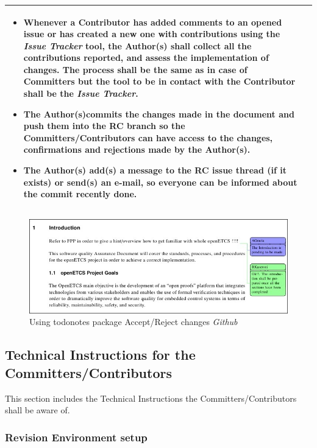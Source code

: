 \documentclass{template/openetcs_article}
\begin{document}
\begin{flushleft}
\begin{supertabular}{|m{2cm}|m{13cm}|}
\begin{itemize}
\begin{enumerate}
\end{enumerate}
\item Whenever a Contributor has added comments to an opened issue or has created a new one with contributions using the {\it Issue Tracker} tool, the Author(s) shall collect all the contributions reported, and assess the implementation of changes. The process shall be the same as in case of Committers but the tool to be in contact with the Contributor shall be the {\it Issue Tracker}.
\item The Author(s)commits the changes made in the document and push them into the RC branch so the Committers/Contributors can have access to the changes, confirmations and rejections made by the Author(s).
\item The Author(s) add(s) a message to the RC issue thread (if it exists) or send(s) an e-mail, so everyone can be informed about the commit recently done. 
\end{itemize}
\\\hline
\end{supertabular}
\end{flushleft}

\begin{figure}[H]
\centering
\includegraphics [width=\textwidth]{./figures/CommentConfirmation.JPG}
\caption{Using todonotes package Accept/Reject changes {\it Github}}
\end{figure}

\subsection{Technical Instructions for the Committers/Contributors}

This section includes the Technical Instructions the Committers/Contributors shall be aware of.

\subsubsection{Revision Environment setup}
\end{document}
